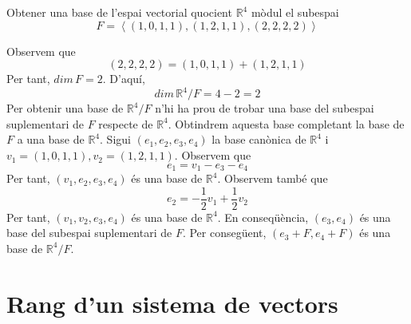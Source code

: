 \begin{exercici}
Obtener una base de l’espai vectorial quocient $\mathbb{R}^{4}$ mòdul
el subespai
\begin{equation*}
F=\left\langle (1,0,1,1),(1,2,1,1),(2,2,2,2)\right\rangle
\end{equation*}

\end{exercici}
\begin{solucio}
Observem que%
\begin{equation*}
(2,2,2,2)=(1,0,1,1)+(1,2,1,1)
\end{equation*}%
Per tant, $dim\,F=2$. D’aquí,
\begin{equation*}
dim\,\mathbb{R}^{4}/F=4-2=2
\end{equation*}%
Per obtenir una base de $\mathbb{R}^{4}/F$ n’hi ha prou de trobar una
base del subespai suplementari de $F$ respecte de $\mathbb{R}%
^{4} $. Obtindrem aquesta base completant la base de $F$ a una base
de $\mathbb{R}^{4}$. Sigui $(e_{1},e_{2},e_{3},e_{4})$ la base canònica de
$\mathbb{R}^{4}$ i $v_{1}=(1,0,1,1),v_{2}=(1,2,1,1)$. Observem que%
\begin{equation*}
e_{1}=v_{1}-e_{3}-e_{4}
\end{equation*}%
Per tant, $(v_{1},e_{2},e_{3},e_{4})$ és una base de $\mathbb{R}^{4}$.
Observem també que%
\begin{equation*}
e_{2}=-\frac{1}{2}v_{1}+\frac{1}{2}v_{2}
\end{equation*}%
Per tant, $(v_{1},v_{2},e_{3},e_{4})$ és una base de $\mathbb{R}^{4}$. En
conseqüència, $(e_{3},e_{4})$ és una base del subespai suplementari de $%
F$. Per consegüent, $(e_{3}+F,e_{4}+F)$ és una
base de $\mathbb{R}^{4}/F$.
\end{solucio}

\section{Rang d’un sistema de vectors}

